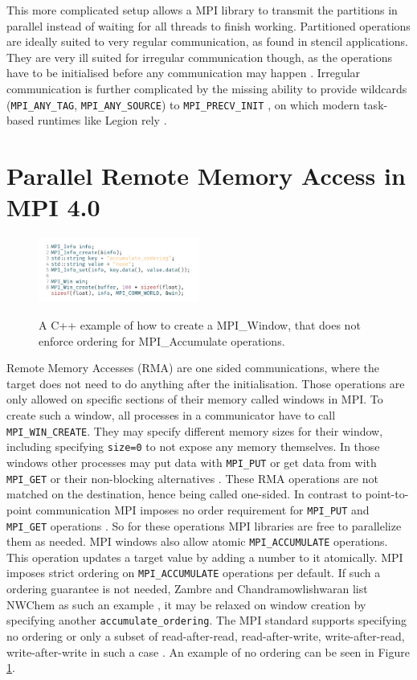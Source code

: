\documentclass[sigconf]{acmart}
\begin{document}
This more complicated setup allows a MPI library to transmit the partitions in parallel instead of waiting for all threads to finish working.
Partitioned operations are ideally suited to very regular communication, as found in stencil applications.
They are very ill suited for irregular communication though, as the operations have to be initialised before any communication may happen \cite{zambreLessonsLearned2022}.
Irregular communication is further complicated by the missing ability to provide wildcards (\verb|MPI_ANY_TAG|, \verb|MPI_ANY_SOURCE|) to \verb|MPI_PRECV_INIT| \cite{mpi40}, on which modern task-based runtimes like Legion rely \cite{zambreLessonsLearned2022}.


\section{Parallel Remote Memory Access in MPI 4.0}

\begin{figure}
    \caption{
        A C++ example of how to create a MPI\_Window, that does not enforce ordering for MPI\_Accumulate operations.
    }
    \includegraphics[width=0.47\textwidth]{RMANoOrdering.png}
    \label{fig:RMANoOrdering_CPP}
\end{figure}

Remote Memory Accesses (RMA) are one sided communications, where the target does not need to do anything after the initialisation.
Those operations are only allowed on specific sections of their memory called windows in MPI.
To create such a window, all processes in a communicator have to call \verb|MPI_WIN_CREATE|.
They may specify different memory sizes for their window, including specifying \verb|size=0| to not expose any memory themselves.
In those windows other processes may put data with \verb|MPI_PUT| or get data from with \verb|MPI_GET| or their non-blocking alternatives \cite{mpi40}.
These RMA operations are not matched on the destination, hence being called one-sided.
In contrast to point-to-point communication MPI imposes no order requirement for \verb|MPI_PUT| and \verb|MPI_GET| operations \cite{mpi40}.
So for these operations MPI libraries are free to parallelize them as needed.
MPI windows also allow atomic \verb|MPI_ACCUMULATE| operations.
This operation updates a target value by adding a number to it atomically.
MPI imposes strict ordering on \verb|MPI_ACCUMULATE| operations per default.
If such a ordering guarantee is not needed, Zambre and Chandramowlishwaran list NWChem as such an example \cite{zambreLessonsLearned2022}, it may be relaxed on window creation by specifying another \verb|accumulate_ordering|.
The MPI standard supports specifying no ordering or only a subset of read-after-read, read-after-write, write-after-read, write-after-write in such a case \cite{mpi40}.
An example of no ordering can be seen in Figure \ref{fig:RMANoOrdering_CPP}.
\end{document}
